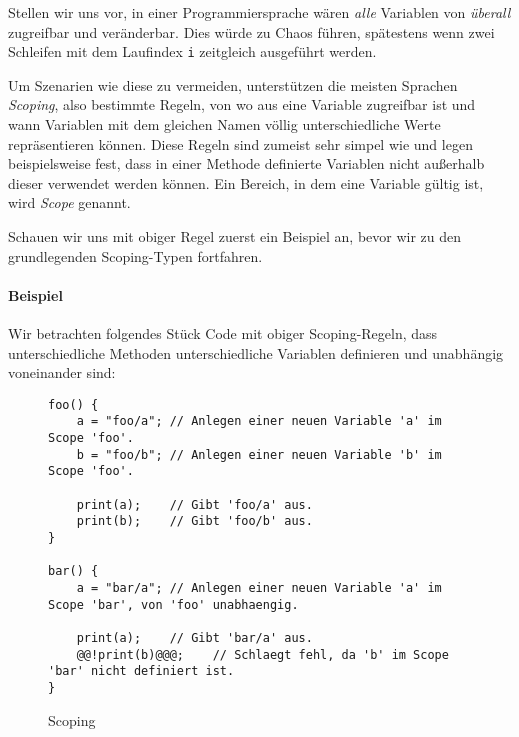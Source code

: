 
Stellen wir uns vor, in einer Programmiersprache wären \textit{alle} Variablen von \textit{überall} zugreifbar und veränderbar. Dies würde zu Chaos führen, spätestens wenn zwei Schleifen mit dem Laufindex \texttt{i} zeitgleich ausgeführt werden.

Um Szenarien wie diese zu vermeiden, unterstützen die meisten Sprachen \textit{Scoping}, also bestimmte Regeln, von wo aus eine Variable zugreifbar ist und wann Variablen mit dem gleichen Namen völlig unterschiedliche Werte repräsentieren können. Diese Regeln sind zumeist sehr simpel wie und legen beispielsweise fest, dass in einer Methode definierte Variablen nicht außerhalb dieser verwendet werden können. Ein Bereich, in dem eine Variable gültig ist, wird \textit{Scope} genannt.

Schauen wir uns mit obiger Regel zuerst ein Beispiel an, bevor wir zu den grundlegenden Scoping-Typen fortfahren.

\paragraph{Beispiel}
	Wir betrachten folgendes Stück Code mit obiger Scoping-Regeln, dass unterschiedliche Methoden unterschiedliche Variablen definieren und unabhängig voneinander sind:
	\begin{figure}[H]
		\centering
		\begin{lstlisting}[style = base]
foo() {
	a = "foo/a"; // Anlegen einer neuen Variable 'a' im Scope 'foo'.
	b = "foo/b"; // Anlegen einer neuen Variable 'b' im Scope 'foo'.

	print(a);    // Gibt 'foo/a' aus.
	print(b);    // Gibt 'foo/b' aus.
}

bar() {
	a = "bar/a"; // Anlegen einer neuen Variable 'a' im Scope 'bar', von 'foo' unabhaengig.

	print(a);    // Gibt 'bar/a' aus.
	@@!print(b)@@@;    // Schlaegt fehl, da 'b' im Scope 'bar' nicht definiert ist.
}
		\end{lstlisting}
		\caption{Scoping}
	\end{figure}

